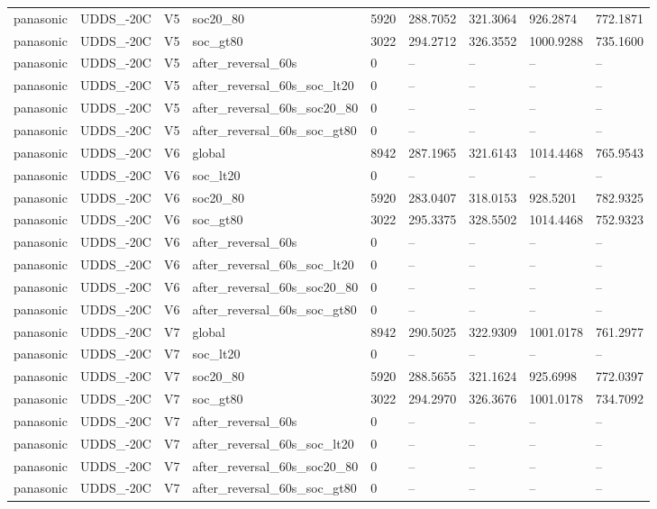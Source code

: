 \begin{tabular}{lllllllll}
panasonic & UDDS\_-20C & V5 & soc20\_80 & 5920 & 288.7052 & 321.3064 & 926.2874 & 772.1871 \\
panasonic & UDDS\_-20C & V5 & soc\_gt80 & 3022 & 294.2712 & 326.3552 & 1000.9288 & 735.1600 \\
panasonic & UDDS\_-20C & V5 & after\_reversal\_60s & 0 & -- & -- & -- & -- \\
panasonic & UDDS\_-20C & V5 & after\_reversal\_60s\_soc\_lt20 & 0 & -- & -- & -- & -- \\
panasonic & UDDS\_-20C & V5 & after\_reversal\_60s\_soc20\_80 & 0 & -- & -- & -- & -- \\
panasonic & UDDS\_-20C & V5 & after\_reversal\_60s\_soc\_gt80 & 0 & -- & -- & -- & -- \\
panasonic & UDDS\_-20C & V6 & global & 8942 & 287.1965 & 321.6143 & 1014.4468 & 765.9543 \\
panasonic & UDDS\_-20C & V6 & soc\_lt20 & 0 & -- & -- & -- & -- \\
panasonic & UDDS\_-20C & V6 & soc20\_80 & 5920 & 283.0407 & 318.0153 & 928.5201 & 782.9325 \\
panasonic & UDDS\_-20C & V6 & soc\_gt80 & 3022 & 295.3375 & 328.5502 & 1014.4468 & 752.9323 \\
panasonic & UDDS\_-20C & V6 & after\_reversal\_60s & 0 & -- & -- & -- & -- \\
panasonic & UDDS\_-20C & V6 & after\_reversal\_60s\_soc\_lt20 & 0 & -- & -- & -- & -- \\
panasonic & UDDS\_-20C & V6 & after\_reversal\_60s\_soc20\_80 & 0 & -- & -- & -- & -- \\
panasonic & UDDS\_-20C & V6 & after\_reversal\_60s\_soc\_gt80 & 0 & -- & -- & -- & -- \\
panasonic & UDDS\_-20C & V7 & global & 8942 & 290.5025 & 322.9309 & 1001.0178 & 761.2977 \\
panasonic & UDDS\_-20C & V7 & soc\_lt20 & 0 & -- & -- & -- & -- \\
panasonic & UDDS\_-20C & V7 & soc20\_80 & 5920 & 288.5655 & 321.1624 & 925.6998 & 772.0397 \\
panasonic & UDDS\_-20C & V7 & soc\_gt80 & 3022 & 294.2970 & 326.3676 & 1001.0178 & 734.7092 \\
panasonic & UDDS\_-20C & V7 & after\_reversal\_60s & 0 & -- & -- & -- & -- \\
panasonic & UDDS\_-20C & V7 & after\_reversal\_60s\_soc\_lt20 & 0 & -- & -- & -- & -- \\
panasonic & UDDS\_-20C & V7 & after\_reversal\_60s\_soc20\_80 & 0 & -- & -- & -- & -- \\
panasonic & UDDS\_-20C & V7 & after\_reversal\_60s\_soc\_gt80 & 0 & -- & -- & -- & -- \\
\hline
\end{tabular}
